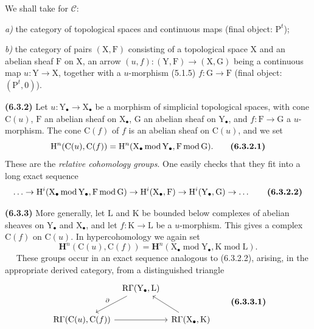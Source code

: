 \documentclass[11pt,leqno]{article}
\newcommand{\Page}[1]{\ifvmode\noindent\else\unskip\ \fi{\footnotesize\textcolor{gray}{[p.\,#1]}}\ \ignorespaces}
\begin{document}
We shall take for \(\mathscr{C}\):

\noindent
\textit{a)} the category of topological spaces and continuous maps (final object: \(\mathrm{P}^{t}\));

\noindent
\textit{b)} the category of pairs \((\mathrm{X},\mathrm{F})\) consisting of a topological space \(\mathrm{X}\) and an abelian sheaf \(\mathrm{F}\) on \(\mathrm{X}\), an arrow \((u,f):(\mathrm{Y},\mathrm{F})\to(\mathrm{X},\mathrm{G})\) being a continuous map \(u:\mathrm{Y}\to\mathrm{X}\), together with a \(u\)-morphism (5.1.5) \(f:\mathrm{G}\to\mathrm{F}\) (final object: \((\mathrm{P}^{t},0)\)).

\textbf{(6.3.2)} Let \(u:\mathrm{Y}_{\bullet}\to\mathrm{X}_{\bullet}\) be a morphism of simplicial topological spaces, with cone \(\mathrm{C}(u)\), \(\mathrm{F}\) an abelian sheaf on \(\mathrm{X}_{\bullet}\), \(\mathrm{G}\) an abelian sheaf on \(\mathrm{Y}_{\bullet}\), and \(f:\mathrm{F}\to\mathrm{G}\) a \(u\)-morphism. The cone \(\mathrm{C}(f)\) of \(f\) is an abelian sheaf on \(\mathrm{C}(u)\), and we set
\[
\mathrm{H}^{n}(\mathrm{C}(u),\mathrm{C}(f))
=\mathrm{H}^{n}(\mathrm{X}_{\bullet}\operatorname{mod}\mathrm{Y}_{\bullet},
\mathrm{F}\operatorname{mod}\mathrm{G}).
\tag*{\textbf{(6.3.2.1)}}
\]
These are the \textit{relative cohomology groups}. One easily checks that they fit into a long exact sequence
\[
\ldots\to
\mathrm{H}^{i}(\mathrm{X}_{\bullet}\operatorname{mod}\mathrm{Y}_{\bullet},
\mathrm{F}\operatorname{mod}\mathrm{G})
\to\mathrm{H}^{i}(\mathrm{X}_{\bullet},\mathrm{F})
\to\mathrm{H}^{i}(\mathrm{Y}_{\bullet},\mathrm{G})
\to\ldots
\tag*{\textbf{(6.3.2.2)}}
\]

\textbf{(6.3.3)} More generally, let \(\mathrm{L}\) and \(\mathrm{K}\) be bounded below complexes of abelian sheaves on \(\mathrm{Y}_{\bullet}\) and \(\mathrm{X}_{\bullet}\), and let \(f:\mathrm{K}\to\mathrm{L}\) be a \(u\)-morphism. This gives a complex \(\mathrm{C}(f)\) on \(\mathrm{C}(u)\). In hypercohomology we again set
\[
\mathbf{H}^{n}(\mathrm{C}(u),\mathrm{C}(f))
=\mathbf{H}^{n}(\mathrm{X}_{\bullet}\operatorname{mod}\mathrm{Y}_{\bullet},
\mathrm{K}\operatorname{mod}\mathrm{L}).
\]
\Page{22}
These groups occur in an exact sequence analogous to (6.3.2.2), arising, in the appropriate derived category, from a distinguished triangle
\[
\begin{tikzcd}[column sep=0.5em,row sep=2em]
& \mathrm{R}\Gamma(\mathrm{Y}_{\bullet},\mathrm{L})
  \arrow[dl,"\partial"'] & \\
\mathrm{R}\Gamma(\mathrm{C}(u),\mathrm{C}(f)) \arrow[rr]
& & \mathrm{R}\Gamma(\mathrm{X}_{\bullet},\mathrm{K}) \arrow[ul]
\end{tikzcd}
\tag*{\textbf{(6.3.3.1)}}
\]
\end{document}
